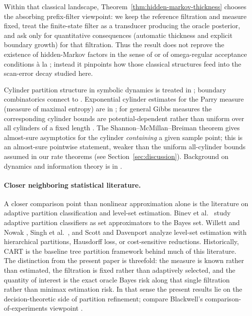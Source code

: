 Within that classical landscape, Theorem~\ref{thm:hidden-markov-thickness}
chooses the absorbing prefix-filter viewpoint: we keep the reference filtration
and measure fixed, treat the finite-state filter as a transducer producing the
oracle posterior, and ask only for quantitative consequences (automatic
thickness and explicit boundary growth) for that filtration.  Thus the result
does not reprove the existence of hidden-Markov factors in the sense of
\cite{Blackwell1957,BaumPetrie1966} or of omega-regular acceptance conditions
\`a la \cite{Thomas1990,PerrinPin2004}; instead it pinpoints how those classical
structures feed into the scan-error decay studied here.

Cylinder partition structure in symbolic dynamics is treated in
\cite{LindMarcus1995}; boundary combinatorics connect to
\cite{Fischer1975,Krieger1984,Boyle1983}.  Exponential cylinder estimates for
the Parry measure (measure of maximal entropy) are in \cite{Parry1964}; for
general Gibbs measures the corresponding cylinder bounds are
potential-dependent rather than uniform over all cylinders of a fixed length
\cite{Bowen1975,WaltersErgodicTheory}.
The Shannon--McMillan--Breiman theorem \cite{Shannon1948,McMillan1953,Breiman1957}
gives almost-sure asymptotics for the cylinder \emph{containing} a given
sample point; this is an almost-sure pointwise statement, weaker than the
uniform all-cylinder bounds assumed in our rate theorems (see
Section~\ref{sec:discussion}).  Background on dynamics and information theory
is in \cite{WaltersErgodicTheory,LindMarcus1995,CoverThomas2006,MorseHedlund1940}.

\paragraph{Closer neighboring statistical literature.}
A closer comparison point than nonlinear approximation alone is the literature
on adaptive partition classification and level-set estimation.  Binev et al.\
\cite{BinevCohenDahmenDeVore2014} study adaptive partition classifiers as set
approximators to the Bayes set.  Willett and Nowak
\cite{WillettNowak2007}, Singh et al.\ \cite{SinghScottNowak2009}, and Scott
and Davenport \cite{ScottDavenport2007} analyze level-set estimation with
hierarchical partitions, Hausdorff loss, or cost-sensitive reductions.
Historically, CART \cite{BreimanFriedmanOlshenStone1984} is the baseline tree
partition framework behind much of this literature.  The distinction from the
present paper is threefold: the measure is known rather than estimated, the
filtration is fixed rather than adaptively selected, and the quantity of
interest is the exact oracle Bayes risk along that single filtration rather
than minimax estimation risk.  In that sense the present results lie on the
decision-theoretic side of partition refinement; compare Blackwell's
comparison-of-experiments viewpoint \cite{Blackwell1951}.

